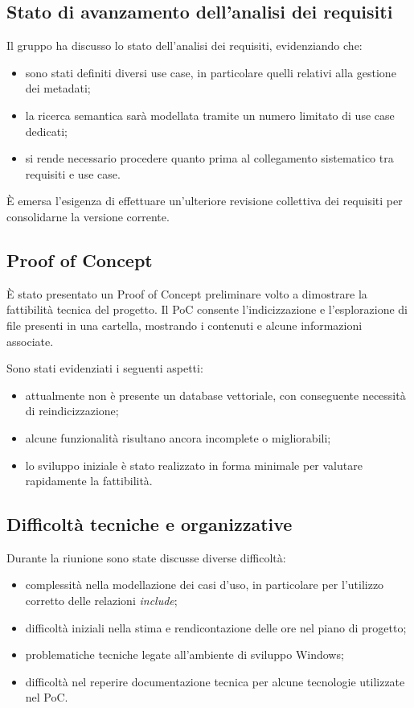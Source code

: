 \documentclass[a4paper,12pt]{article}
\begin{document}
\subsection{Stato di avanzamento dell'analisi dei requisiti}
Il gruppo ha discusso lo stato dell'analisi dei requisiti, evidenziando che:
\begin{itemize}[noitemsep]
    \item sono stati definiti diversi use case, in particolare quelli relativi alla gestione dei metadati;
    \item la ricerca semantica sarà modellata tramite un numero limitato di use case dedicati;
    \item si rende necessario procedere quanto prima al collegamento sistematico tra requisiti e use case.
\end{itemize}

È emersa l'esigenza di effettuare un'ulteriore revisione collettiva dei requisiti per consolidarne la versione corrente.

\subsection{Proof of Concept}
È stato presentato un Proof of Concept preliminare volto a dimostrare la fattibilità tecnica del progetto.  
Il PoC consente l'indicizzazione e l'esplorazione di file presenti in una cartella, mostrando i contenuti e alcune informazioni associate.

Sono stati evidenziati i seguenti aspetti:
\begin{itemize}[noitemsep]
    \item attualmente non è presente un database vettoriale, con conseguente necessità di reindicizzazione;
    \item alcune funzionalità risultano ancora incomplete o migliorabili;
    \item lo sviluppo iniziale è stato realizzato in forma minimale per valutare rapidamente la fattibilità.
\end{itemize}

\subsection{Difficoltà tecniche e organizzative}
Durante la riunione sono state discusse diverse difficoltà:
\begin{itemize}[noitemsep]
    \item complessità nella modellazione dei casi d'uso, in particolare per l'utilizzo corretto delle relazioni \textit{include};
    \item difficoltà iniziali nella stima e rendicontazione delle ore nel piano di progetto;
    \item problematiche tecniche legate all'ambiente di sviluppo Windows;
    \item difficoltà nel reperire documentazione tecnica per alcune tecnologie utilizzate nel PoC.
\end{itemize}
\end{document}
